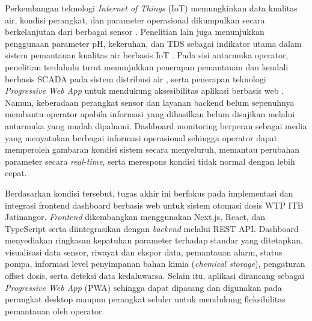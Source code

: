 Perkembangan teknologi \textit{Internet of Things} (IoT) memungkinkan data
kualitas air, kondisi perangkat, dan parameter operasional dikumpulkan secara
berkelanjutan dari berbagai sensor \autocite{ismail2022iot}. Penelitian lain
juga menunjukkan penggunaan parameter pH, kekeruhan, dan TDS sebagai indikator
utama dalam sistem pemantauan kualitas air berbasis IoT
\autocite{kumar2024iot}. Pada sisi antarmuka operator, penelitian terdahulu
turut menunjukkan penerapan pemantauan dan kendali berbasis SCADA pada sistem
distribusi air \autocite{low2022scada}, serta penerapan teknologi
\textit{Progressive Web App} untuk mendukung aksesibilitas aplikasi berbasis
web \autocite{azhar2022pwa}. Namun, keberadaan perangkat sensor dan layanan
backend belum sepenuhnya membantu operator apabila informasi yang dihasilkan
belum disajikan melalui antarmuka yang mudah dipahami. Dashboard monitoring
berperan sebagai media yang menyatukan berbagai informasi operasional sehingga
operator dapat memperoleh gambaran kondisi sistem secara menyeluruh, memantau
perubahan parameter secara \textit{real-time}, serta merespons kondisi tidak
normal dengan lebih cepat.

Berdasarkan kondisi tersebut, tugas akhir ini berfokus pada implementasi dan
integrasi frontend dashboard berbasis web untuk sistem otomasi dosis WTP ITB
Jatinangor. \textit{Frontend} dikembangkan menggunakan Next.js, React, dan TypeScript
serta diintegrasikan dengan \textit{backend} melalui REST API. Dashboard menyediakan
ringkasan kepatuhan parameter terhadap standar yang ditetapkan, visualisasi data
sensor, riwayat dan ekspor data, pemantauan alarm, status pompa, informasi
level penyimpanan bahan kimia (\textit{chemical storage}), pengaturan offset
dosis, serta deteksi data kedaluwarsa. Selain itu, aplikasi dirancang sebagai
\textit{Progressive Web App} (PWA) sehingga dapat dipasang dan digunakan pada
perangkat desktop maupun perangkat seluler untuk mendukung fleksibilitas
pemantauan oleh operator.
